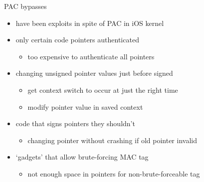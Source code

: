 \begin{frame}{PAC bypasses}
    \begin{itemize}
    \item have been exploits in spite of PAC in iOS kernel
    \vspace{.5cm}
    \item only certain code pointers authenticated
        \begin{itemize}
        \item too expensive to authenticate all pointers
        \end{itemize}
    \item changing unsigned pointer values just before signed 
        \begin{itemize}
        \item get context switch to occur at just the right time
        \item modify pointer value in saved context
        \end{itemize}
    \item code that signs pointers they shouldn't
        \begin{itemize}
        \item changing pointer without crashing if old pointer invalid
        \end{itemize}
    \item `gadgets' that allow brute-forcing MAC tag
        \begin{itemize}
        \item not enough space in pointers for non-brute-forceable tag
        \end{itemize}
    \end{itemize}
\end{frame}
